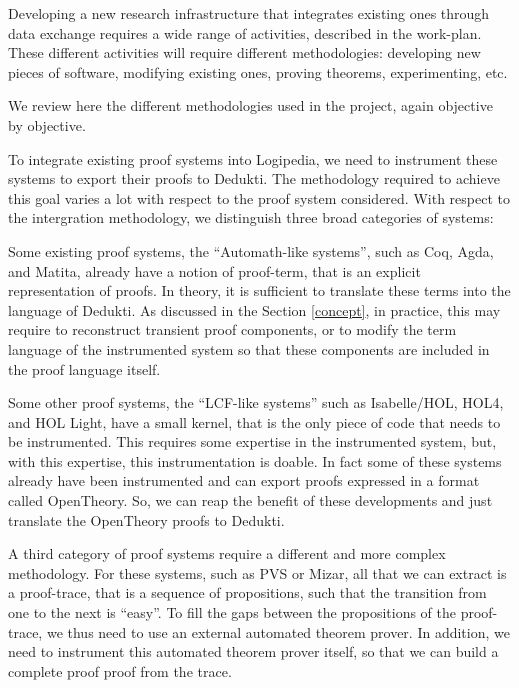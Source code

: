 Developing a new research infrastructure that integrates existing ones
through data exchange requires a wide range of activities, described
in the work-plan. These different activities will require different
methodologies: developing new pieces of software, modifying existing
ones, proving theorems, experimenting, etc.

We review here the different methodologies used in the project, again 
objective by objective.


To integrate existing proof systems into Logipedia, we need to
instrument these systems to export their proofs to
Dedukti. The methodology required to achieve this goal varies a lot
with respect to the proof system considered. With respect to the
intergration methodology, we distinguish three broad categories of
systems:

\begin{compactitem}
\item
Some existing proof systems, the ``Automath-like systems'', such as Coq, Agda, and
Matita, already have a notion of proof-term, that is an explicit
representation of proofs.  In theory, it is sufficient to translate
these terms into the language of Dedukti.  As discussed in the Section
\ref{concept}, in practice, this may require to reconstruct transient
proof components, or to modify the term language of the instrumented
system so that these components are included in the proof language
itself.

\item
Some other proof systems, the ``LCF-like systems'' such as
Isabelle/HOL, HOL4, and HOL Light, have a small kernel, that is the
only piece of code that needs to be instrumented. This requires some
expertise in the instrumented system, but, with this expertise, this
instrumentation is doable. In fact some of these systems already have
been instrumented and can export proofs expressed in a format called
OpenTheory. So, we can reap the benefit of these developments and just
translate the OpenTheory proofs to Dedukti.

\item A third category of proof systems require a different and more
  complex methodology. For these systems, such as PVS or Mizar, all
  that we
  can extract is a proof-trace, that is a sequence of propositions,
  such that the transition from one to the next is ``easy''.
  To fill the gaps between the propositions of the proof-trace,
  we thus need to use an external automated theorem prover. In
  addition, we need to instrument this automated theorem prover
  itself, so that we can build a complete proof proof from the trace.
\end{compactitem}

